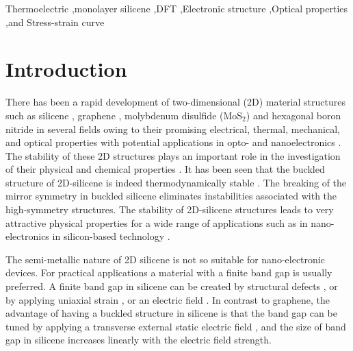 \documentclass[5p,twocolumn]{elsarticle}
\begin{document}
\begin{frontmatter}
\begin{keyword}
Thermoelectric \sep monolayer silicene \sep DFT \sep Electronic structure \sep  Optical properties \sep  and Stress-strain curve 
\end{keyword}



\end{frontmatter}



\section{Introduction} 


There has been a rapid development of two-dimensional (2D) material structures such as silicene \cite{LeLay2015}, graphene \cite{Ren2014}, molybdenum disulfide (MoS$_2$) \cite{Kibsgaard2012} and hexagonal boron nitride \cite{Zhang_2017} in several fields owing to their promising electrical, thermal, mechanical, and optical properties with potential applications in opto- and nanoelectronics \cite{Tao2015}. The stability of these 2D structures plays an important role in the investigation of their physical and chemical properties \cite{Kharadi_2020}.
It has been seen that the buckled structure of 2D-silicene is indeed thermodynamically stable \cite{PhysRevLett.102.236804}.
The breaking of the mirror symmetry in buckled silicene eliminates instabilities associated with the high-symmetry structures.
The stability of 2D-silicene structures leads to very attractive physical properties for a wide range of applications such as in nano-electronics in silicon-based technology \cite{OUGHADDOU201546, RASHID2019102625}. 


The semi-metallic nature of 2D silicene is not 
so suitable for nano-electronic devices. For practical applications a material with a finite band gap is usually preferred. 
A finite band gap in silicene can be created by structural defects \cite{Li2015}, or by applying uniaxial strain \cite{Houmad2019}, or an electric field \cite{PhysRevB.85.075423}. In contrast to graphene, 
the advantage of having a buckled structure in silicene is that the band gap can be tuned by
applying a transverse external static electric field \cite{doi:10.1021/nl203065e}, and
the size of band gap in silicene increases linearly with the electric field strength.
\end{document}
